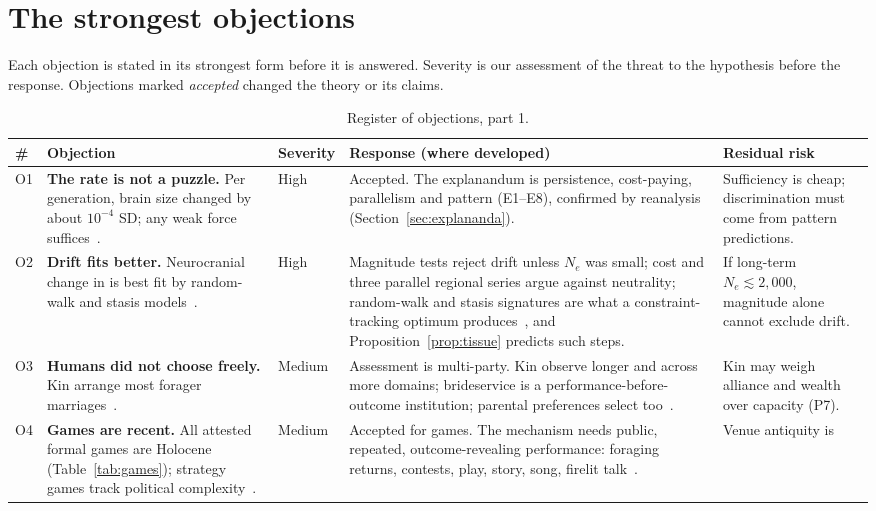 \section{The strongest objections}\label{sec:redteam}

\noindent Each objection is stated in its strongest form before it is answered. Severity is our assessment of the threat to
the hypothesis before the response. Objections marked \emph{accepted} changed the theory or its claims.

\begin{table}[tp]
\caption{Register of objections, part 1.}\label{tab:red}
\scriptsize
\begin{tabularx}{\textwidth}{@{}P{0.028\textwidth}P{0.225\textwidth}P{0.05\textwidth}LP{0.19\textwidth}@{}}
\toprule
\# & Objection & Severity & Response (where developed) & Residual risk\\
\midrule
O1 & \textbf{The rate is not a puzzle.} Per generation, brain size changed by about $10^{-4}$ SD; any weak force
suffices~\cite{gingerich2022}. & High & Accepted. The explanandum is persistence, cost-paying, parallelism and pattern
(E1--E8), confirmed by reanalysis (Section~\ref{sec:explananda}). & Sufficiency is cheap; discrimination must come from pattern
predictions.\\
O2 & \textbf{Drift fits better.} Neurocranial change in \Homo{} is best fit by random-walk and stasis
models~\cite{hubbe2026}. & High & Magnitude tests reject drift unless $N_e$ was small; cost and three parallel regional series
argue against neutrality; random-walk and stasis signatures are what a constraint-tracking optimum
produces~\cite{estes2007}, and Proposition~\ref{prop:tissue} predicts such steps. & If long-term $N_e\lesssim2{,}000$,
magnitude alone cannot exclude drift.\\
O3 & \textbf{Humans did not choose freely.} Kin arrange most forager marriages~\cite{walker2011}. & Medium & Assessment is
multi-party. Kin observe longer and across more domains; brideservice is a performance-before-outcome institution; parental
preferences select too~\cite{apostolou2007}. & Kin may weigh alliance and wealth over capacity (P7).\\
O4 & \textbf{Games are recent.} All attested formal games are Holocene (Table~\ref{tab:games}); strategy games track political
complexity~\cite{roberts1959}. & Medium & Accepted for games. The mechanism needs public, repeated, outcome-revealing
performance: foraging returns, contests, play, story, song, firelit talk~\cite{wiessner2014,scalise2018}. & Venue antiquity is

\end{tabularx}
\end{table}
